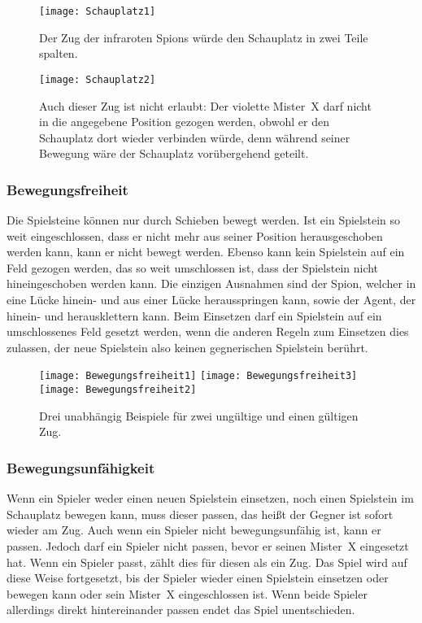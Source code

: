 \documentclass[ngerman, gray]{sdqassignment}
\begin{document}
\begin{figure}[ht]
    \centering
    \texttt{[image: Schauplatz1]}
    \label{fig:schauplatz1}
    \caption{Der Zug der infraroten Spions würde den Schauplatz in zwei Teile spalten.}
\end{figure}

\begin{figure}[ht]
    \centering
    \texttt{[image: Schauplatz2]}
    \label{fig:schauplatz2}
    \caption{Auch dieser Zug ist nicht erlaubt: Der violette Mister~X darf nicht in die angegebene Position gezogen werden, obwohl er den Schauplatz dort wieder verbinden würde, denn während seiner Bewegung wäre der Schauplatz vorübergehend geteilt.}
\end{figure}

\subsubsection{Bewegungsfreiheit}
\label{freiheit}
Die Spielsteine können nur durch Schieben bewegt werden. Ist ein Spielstein so weit eingeschlossen, dass er nicht mehr aus seiner Position herausgeschoben werden kann, kann er nicht bewegt werden. Ebenso kann kein Spielstein auf ein Feld gezogen werden, das so weit umschlossen ist, dass der Spielstein nicht hineingeschoben werden kann. Die einzigen Ausnahmen sind der Spion, welcher in eine Lücke hinein- und aus einer Lücke herausspringen kann, sowie der Agent, der hinein- und herausklettern kann. Beim Einsetzen darf ein Spielstein auf ein umschlossenes Feld gesetzt werden, wenn die anderen Regeln zum Einsetzen dies zulassen, der neue Spielstein also keinen gegnerischen Spielstein berührt.

\begin{figure}[ht]
    \centering
    \texttt{[image: Bewegungsfreiheit1]}
    \hfil
    \texttt{[image: Bewegungsfreiheit3]}
    \hfil
    \texttt{[image: Bewegungsfreiheit2]}
    \label{fig:freiheit}
    \caption{Drei unabhängig Beispiele für zwei ungültige und einen gültigen Zug.}
\end{figure}

\subsubsection{Bewegungsunfähigkeit}
\label{passen}
Wenn ein Spieler weder einen neuen Spielstein einsetzen, noch einen Spielstein im Schauplatz bewegen kann, muss dieser passen, das heißt der Gegner ist sofort wieder am Zug. Auch wenn ein Spieler nicht bewegungsunfähig ist, kann er passen. Jedoch darf ein Spieler nicht passen, bevor er seinen Mister~X eingesetzt hat. Wenn ein Spieler passt, zählt dies für diesen als ein Zug. Das Spiel wird auf diese Weise fortgesetzt, bis der Spieler wieder einen Spielstein einsetzen oder bewegen kann oder sein Mister~X eingeschlossen ist. Wenn beide Spieler allerdings direkt hintereinander passen endet das Spiel unentschieden.
\end{document}
